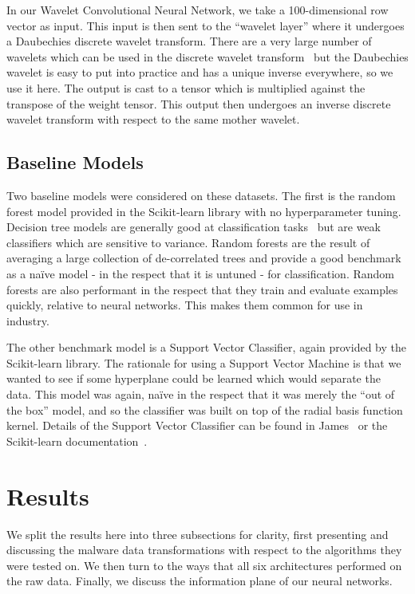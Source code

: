 In our Wavelet Convolutional Neural Network, we take a 100-dimensional row vector as input.
This input is then sent to the ``wavelet layer'' where it undergoes a Daubechies discrete wavelet transform.
There are a very large number of wavelets which can be used in the discrete wavelet transform~\cite{mallat1999wavelet} but the Daubechies wavelet is easy to put into practice and has a unique inverse everywhere, so we use it here.
The output is cast to a tensor which is multiplied against the transpose of the weight tensor.
This output then undergoes an inverse discrete wavelet transform with respect to the same mother wavelet.

\subsection{Baseline Models} \label{other models}
Two baseline models were considered on these datasets.
The first is the random forest model provided in the Scikit-learn library with no hyperparameter tuning.
Decision tree models are generally good at classification tasks~\cite{hastie01statisticallearning} but are weak classifiers which are sensitive to variance.
Random forests are the result of averaging a large collection of de-correlated trees and provide a good benchmark as a na\"ive model - in the respect that it is untuned - for classification.
Random forests are also performant in the respect that they train and evaluate examples quickly, relative to neural networks.
This makes them common for use in industry.

The other benchmark model is a Support Vector Classifier, again provided by the Scikit-learn library.
The rationale for using a Support Vector Machine is that we wanted to see if some hyperplane could be learned which would separate the data.
This model was again, na\"ive in the respect that it was merely the ``out of the box'' model, and so the classifier was built on top of the radial basis function kernel.
Details of the Support Vector Classifier can be found in James~\cite{james14introduction} or the Scikit-learn documentation~\cite{scikit-learn}.


\section{Results} \label{malware results}
We split the results here into three subsections for clarity, first presenting and discussing the malware data transformations with respect to the algorithms they were tested on. 
We then turn to the ways that all six architectures performed on the raw data.
Finally, we discuss the information plane of our neural networks.

